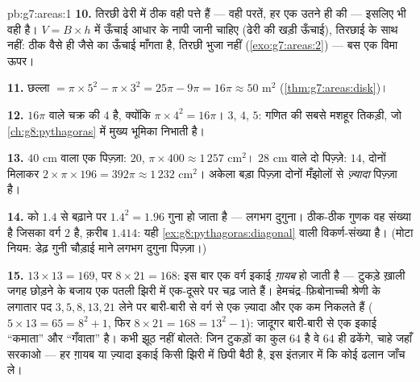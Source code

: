 \begin{solution}{pb:g7:areas:1}
\textbf{10.} तिरछी ढेरी में ठीक वही पत्ते हैं --- वही परतें, हर एक
उतने ही  की --- इसलिए  भी वही है। $V = B \times h$ में
ऊँचाई आधार के \emph{} नापी जानी चाहिए (ढेरी की खड़ी ऊँचाई),
तिरछाई के साथ नहीं: ठीक वैसे ही जैसे  का 
 ऊँचाई माँगता है, तिरछी भुजा नहीं (\cref{exo:g7:areas:2}) ---
बस एक विमा ऊपर।

\textbf{11.} छल्ला $= \pi \times 5^2 - \pi \times 3^2 = 25\pi -
9\pi = 16\pi \approx 50$ m$^2$ (\cref{thm:g7:areas:disk})।

\textbf{12.} $16\pi$  वाले चक्र की  $4$ है,
क्योंकि $\pi \times 4^2 = 16\pi$।  $3$, $4$, $5$: गणित की
सबसे मशहूर तिकड़ी, जो \cref{ch:g8:pythagoras} में मुख्य भूमिका
निभाती है।

\textbf{13.} $40$ cm वाला एक पिज़्ज़ा:  $20$, 
$\pi \times 400 \approx 1\,257$ cm$^2$। $28$ cm वाले दो पिज़्ज़े:
 $14$, दोनों मिलाकर
$2 \times \pi \times 196 = 392\pi \approx 1\,232$ cm$^2$। अकेला बड़ा
पिज़्ज़ा दोनों मँझोलों से \emph{ज़्यादा} पिज़्ज़ा है।

\textbf{14.}  को $1.4$ से बढ़ाने पर 
$1.4^2 = 1.96$ गुना हो जाता है --- लगभग दुगुना। ठीक-ठीक गुणक वह
संख्या है जिसका वर्ग $2$ है, क़रीब $1.414$: यही
\cref{ex:g8:pythagoras:diagonal} वाली विकर्ण-संख्या है। (मोटा
नियम: डेढ़ गुनी चौड़ाई माने लगभग दुगुना पिज़्ज़ा।)

\textbf{15.} $13 \times 13 = 169$, पर $8 \times 21 = 168$: इस बार
एक वर्ग इकाई \emph{ग़ायब} हो जाती है --- टुकड़े ख़ाली जगह छोड़ने के
बजाय एक पतली झिरी में एक-दूसरे पर चढ़ जाते हैं।
हेमचंद्र--फ़िबोनाच्ची श्रेणी के लगातार पद $3, 5, 8, 13, 21$ लेने पर
 बारी-बारी से वर्ग से एक ज़्यादा और एक कम निकलते हैं
($5 \times 13 = 65 = 8^2 + 1$, फिर $8 \times 21 = 168 = 13^2 - 1$):
जादूगर बारी-बारी से एक इकाई ``कमाता'' और ``गँवाता'' है। 
कभी झूठ नहीं बोलते: जिन टुकड़ों का कुल $64$ है वे $64$ ही ढकेंगे,
चाहे जहाँ सरकाओ --- हर ग़ायब या ज़्यादा इकाई किसी झिरी में छिपी
बैठी है, इस इंतज़ार में कि कोई ढलान जाँच ले।

\end{solution}
